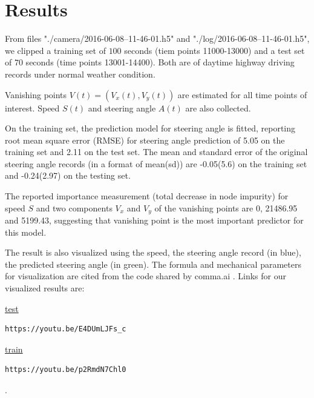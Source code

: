 \documentclass[11pt, oneside]{article}
\begin{document}
\section*{Results}

From files "./camera/2016-06-08--11-46-01.h5" and "./log/2016-06-08--11-46-01.h5", we clipped a training set of $100$ seconds (tiem points 11000-13000) and a test set of $70$ seconds (time points 13001-14400). Both are of daytime highway driving records under normal weather condition. 

Vanishing points $V(t) = (V_x(t), V_y(t))$ are estimated for all time points of interest. Speed $S(t)$ and steering angle $A(t)$ are also collected. 


On the training set, the prediction model for steering angle is fitted, reporting root mean square error (RMSE) for steering angle prediction of 5.05 on the training set and 2.11 on the test set. The mean and standard error of the original steering angle records (in a format of mean(sd)) are -0.05(5.6) on the training set and -0.24(2.97) on the testing set. 

The reported importance measurement (total decrease in node impurity) for speed $S$ and two components $V_x$ and $V_y$ of the vanishing points are 0, 21486.95 and 5199.43, suggesting that vanishing point is the most important predictor for this model. 

The result is also visualized using the speed, the steering angle record (in blue), the predicted steering angle (in green). The formula and mechanical parameters for visualization are cited from the code shared by comma.ai \cite{github}. Links for our visualized results are:

\href{https://youtu.be/E4DUmLJFs_c}{test}
\begin{verbatim}
https://youtu.be/E4DUmLJFs_c
\end{verbatim}

\href{https://youtu.be/p2RmdN7Chl0}{train}
\begin{verbatim}
https://youtu.be/p2RmdN7Chl0
\end{verbatim}
. 
\end{document}
